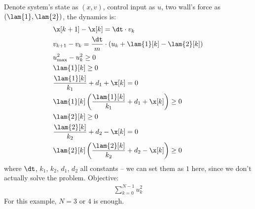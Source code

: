 Denote system's state as $(x, v)$, control input as $u$, two wall's force as $(\lam{1}, \lam{2})$, the dynamics is:
\begin{align}
    & \x[k+1] - \x[k] = \dt \cdot v_k \\
    & v_{k+1} - v_k = \frac{\dt}{m} \cdot (u_k + \lam{1}[k] - \lam{2}[k]) \\
    & u_{\max}^2 - u_k^2 \ge 0 \\
    & \lam{1}[k] \ge 0 \\
    & \frac{\lam{1}[k] }{k_1} + d_1 + \x[k] = 0 \\
    & \lam{1}[k] \left( \frac{\lam{1}[k] }{k_1} + d_1 + \x[k] \right) \ge 0 \\
    & \lam{2}[k] \ge 0 \\
    & \frac{\lam{2}[k] }{k_2} + d_2 - \x[k] = 0 \\
    & \lam{2}[k] \left( \frac{\lam{2}[k] }{k_2} + d_2 - \x[k] \right) \ge 0
\end{align} 
where $\dt$, $k_1$, $k_2$, $d_1$, $d_2$ all constants -- we can set them as $1$ here, since we don't actually solve the problem. Objective:
\begin{align}
    \sum_{k=0}^{N-1} u_k^2 
\end{align}
For this example, $N = 3$ or $4$ is enough.
